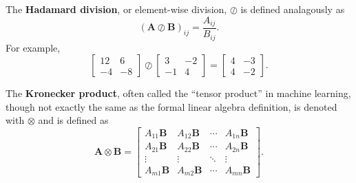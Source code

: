 \documentclass[12pt]{report}
\theoremstyle{definition}
\theoremstyle{remark}
\begin{document}
The \textbf{Hadamard division}, or element-wise division, $\oslash$ is defined analagously as
\begin{equation}
    ({{\mathbf{A} \oslash \mathbf{B}}})_{ij} = \frac{A_{ij}}{B_{ij}}.
\end{equation}
For example,
\begin{equation}
    \begin{bmatrix}
        12 & 6 \\
        -4 & -8
    \end{bmatrix} \oslash \begin{bmatrix}
        3 & -2 \\
        -1 & 4
    \end{bmatrix} = \begin{bmatrix}
        4 & -3 \\
        4 & -2
    \end{bmatrix}.
\end{equation}

The \textbf{Kronecker product}, often called the ``tensor product'' in machine learning, though not exactly the same as the formal linear algebra definition, is denoted with $\otimes$ and is defined as
\begin{equation}
    \mathbf{A} \otimes \mathbf{B} = \begin{bmatrix}
        A_{11}\mathbf{B} & A_{12}\mathbf{B} & \cdots & A_{1n}\mathbf{B} \\
        A_{21}\mathbf{B} & A_{22}\mathbf{B} & \cdots & A_{2n}\mathbf{B} \\
        \vdots & \vdots & \ddots & \vdots \\
        A_{m1}\mathbf{B} & A_{m2}\mathbf{B} & \cdots & A_{mn}\mathbf{B}
    \end{bmatrix}.
\end{equation}
\end{document}
